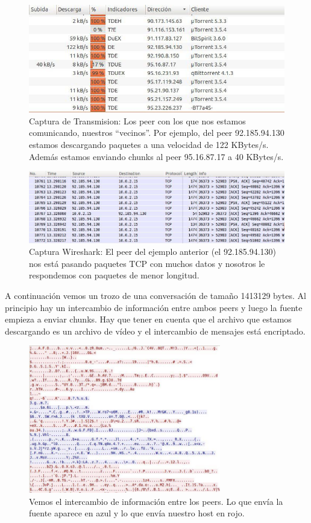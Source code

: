 \documentclass{article}
\begin{document}
\begin{figure}[H]
  \centering
  \includegraphics[width=139mm]{imagenes/peers}
  \caption{Captura de Transmision: Los peer con los que nos estamos comunicando, nuestros ``vecinos''. Por ejemplo, del peer 92.185.94.130 estamos descargando paquetes a una velocidad de 122 KBytes/s. Además estamos enviando chunks al peer 95.16.87.17 a 40 KBytes/s.}
\end{figure}

\begin{figure}[H]
  \centering
  \includegraphics[width=139mm]{imagenes/TCP_wireshark}
  \caption{Captura Wireshark: El peer del ejemplo anterior (el 92.185.94.130) nos está pasando paquetes TCP con muchos datos y nosotros le respondemos con paquetes de menor longitud.}
\end{figure}

A continuación vemos un trozo de una conversación de tamaño 1413129 bytes. Al principio hay un intercambio de información entre ambos peers y luego la fuente empieza a enviar chunks.
Hay que tener en cuenta que el archivo que estamos descargando es un archivo de vídeo y el intercambio de mensajes está encriptado.

\begin{figure}[H]
  \centering
  \includegraphics[width=84mm]{imagenes/trama_rojo}
  \caption{Vemos el intercambio de información entre los peers. Lo que envía la fuente aparece en azul y lo que envía nuestro host en rojo.}
\end{figure}
\end{document}
